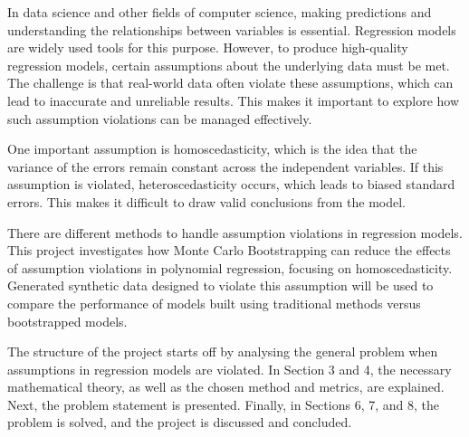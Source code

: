 In data science and other fields of computer science, making predictions and understanding the relationships between variables is essential. Regression models are widely used tools for this purpose. However, to produce high-quality regression models, certain assumptions about the underlying data must be met. The challenge is that real-world data often violate these assumptions, which can lead to inaccurate and unreliable results. This makes it important to explore how such assumption violations can be managed effectively. \newline

\noindent One important assumption is homoscedasticity, which is the idea that the variance of the errors remain constant across the independent variables. If this assumption is violated, heteroscedasticity occurs, which leads to biased standard errors. This makes it difficult to draw valid conclusions from the model. \newline


\noindent There are different methods to handle assumption violations in regression models. This project investigates how Monte Carlo Bootstrapping can reduce the effects of assumption violations in polynomial regression, focusing on homoscedasticity. Generated synthetic data designed to violate this assumption will be used to compare the performance of models built using traditional methods versus bootstrapped models.\newline

\noindent The structure of the project starts off by analysing the general problem when assumptions in regression models are violated. In Section 3 and 4, the necessary mathematical theory, as well as the chosen method and metrics, are explained. Next, the problem statement is presented. Finally, in Sections 6, 7, and 8, the problem is solved, and the project is discussed and concluded.
